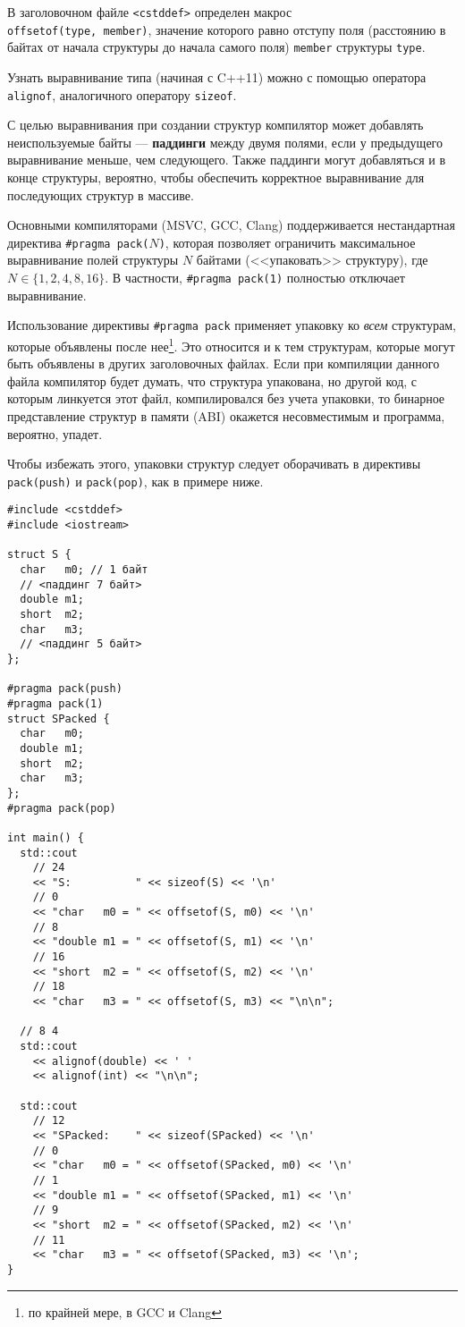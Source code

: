 В заголовочном файле \verb|<cstddef>| определен макрос\\ \verb|offsetof(type, member)|,
значение которого равно отступу поля (расстоянию в байтах от начала структуры до начала
самого поля) \verb|member| структуры \verb|type|.

Узнать выравнивание типа (начиная с C++11) можно с помощью
оператора \verb|alignof|, аналогичного оператору \verb|sizeof|.

С целью выравнивания при создании структур компилятор может добавлять
неиспользуемые байты --- \textbf{паддинги} между двумя полями,
если у предыдущего выравнивание меньше, чем следующего. Также паддинги
могут добавляться и в конце структуры, вероятно, чтобы обеспечить корректное
выравнивание для последующих структур в массиве.

Основными компиляторами (MSVC, GCC, Clang) поддерживается нестандартная директива
\verb|#pragma pack(|$N$\verb|)|, которая позволяет ограничить максимальное
выравнивание полей структуры $N$ байтами (<<упаковать>> структуру), где $N \in \{1,2,4,8,16\}$.
В частности, \verb|#pragma pack(1)| полностью отключает выравнивание.

Использование директивы \verb|#pragma pack|
применяет упаковку ко \textit{всем} структурам, которые объявлены после нее\footnote{по крайней мере, в GCC и Clang}.
Это относится и к тем структурам, которые могут быть объявлены в других заголовочных файлах.
Если при компиляции данного файла компилятор будет думать, что структура упакована,
но другой код, с которым линкуется этот файл, компилировался без учета упаковки,
то бинарное представление структур в памяти (ABI) окажется несовместимым и
программа, вероятно, упадет.

Чтобы избежать этого, упаковки структур следует оборачивать в директивы
\verb|pack(push)| и \verb|pack(pop)|, как в примере ниже.

\begin{verbatim}
#include <cstddef>
#include <iostream>
  
struct S {
  char   m0; // 1 байт
  // <паддинг 7 байт> 
  double m1;
  short  m2;
  char   m3;
  // <паддинг 5 байт>
};

#pragma pack(push)
#pragma pack(1)
struct SPacked {
  char   m0;
  double m1;
  short  m2;
  char   m3;
};
#pragma pack(pop)
  
int main() {
  std::cout
    // 24
    << "S:          " << sizeof(S) << '\n'
    // 0
    << "char   m0 = " << offsetof(S, m0) << '\n'
    // 8
    << "double m1 = " << offsetof(S, m1) << '\n'
    // 16
    << "short  m2 = " << offsetof(S, m2) << '\n'
    // 18
    << "char   m3 = " << offsetof(S, m3) << "\n\n";

  // 8 4
  std::cout
    << alignof(double) << ' '
    << alignof(int) << "\n\n";

  std::cout
    // 12
    << "SPacked:    " << sizeof(SPacked) << '\n'
    // 0
    << "char   m0 = " << offsetof(SPacked, m0) << '\n'
    // 1
    << "double m1 = " << offsetof(SPacked, m1) << '\n'
    // 9
    << "short  m2 = " << offsetof(SPacked, m2) << '\n'
    // 11
    << "char   m3 = " << offsetof(SPacked, m3) << '\n';
}
\end{verbatim}

